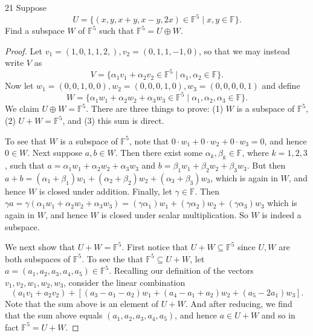 \documentclass{extarticle}
\newenvironment{problem}[1]{\begin{prob*}{#1}{}}{\end{prob*}}
\newcommand{\F}{\mathbb{F}}
\begin{document}
\begin{problem}{21}
Suppose 
\begin{equation*}
U = \{(x, y, x + y, x - y, 2x)\in\F^5 \mid x, y\in \F\}.
\end{equation*}
Find a subspace $W$ of $\F^5$ such that $\F^5 = U \oplus W$.
\end{problem}
\begin{proof}
Let $v_1 = (1, 0, 1, 1, 2,), v_2 = (0, 1, 1, -1, 0)$, so that we may instead write $V$ as
\begin{equation*}
V = \{\alpha_1 v_1 + \alpha_2 v_2 \in \F^5\mid \alpha_1,\alpha_2\in\F\}.
\end{equation*}
Now let $w_1 = (0, 0, 1, 0, 0), w_2 = (0, 0, 0, 1, 0), w_3 = (0, 0, 0, 0, 1)$ and define
\begin{equation*}
W = \{\alpha_1 w_1 + \alpha_2 w_2 + \alpha_3 w_3\in\F^5\mid \alpha_1,\alpha_2, \alpha_3\in\F\}.
\end{equation*}
We claim $U\oplus W = \F^5$.  There are three things to prove: (1) $W$ is a subspace of $\F^5$, (2) $U + W = \F^5$, and (3) this sum is direct.
\par To see that $W$ is a subspace of $\F^5$, note that $0\cdot w_1 + 0\cdot w_2 + 0\cdot w_3 = 0$, and hence $0\in W$.  Next suppose $a,b\in W$.  Then there exist some $\alpha_k,\beta_k\in\F$, where $k = 1,2,3$, such that $a = \alpha_1 w_1 + \alpha_2 w_2 + \alpha_3 w_3$ and $b = \beta_1 w_1 + \beta_2 w_2 +\beta_3 w_3$.  But then $a + b= (\alpha_1 + \beta_1)w_1 + (\alpha_2 + \beta_2)w_2 + (\alpha_3 + \beta_3)w_3$, which is again in $W$, and hence $W$ is closed under addition.  Finally, let $\gamma\in\F$.  Then $\gamma a = \gamma(\alpha_1 w_1 + \alpha_2 w_2 + \alpha_3 w_3) = (\gamma\alpha_1) w_1 + (\gamma\alpha_2) w_2 + (\gamma\alpha_3) w_3$ which is again in $W$, and hence $W$ is closed under scalar multiplication.  So $W$ is indeed a subspace.
\par We next show that $U+W = \F^5$.  First notice that $U+W\subseteq \F^5$ since $U,W$ are both subspaces of $\F^5$.  To see the that $\F^5\subseteq U+W$, let $a=(a_1, a_2, a_3, a_4, a_5)\in\F^5$.   Recalling our definition of the vectors $v_1,v_2,w_1,w_2,w_3$, consider the linear combination
\begin{equation*}
\left(a_1v_1 + a_2v_2\right) + \left[(a_3 - a_1 - a_2)w_1 + (a_4-a_1+a_2)w_2 + (a_5-2a_1)w_3\right].
\end{equation*}
Note that the sum above is an element of $U+W$.  And after reducing, we find that the sum above equals $(a_1, a_2, a_3, a_4, a_5)$, and hence $a\in U+W$ and so in fact $\F^5=U+W$.

\end{proof}
\end{document}
